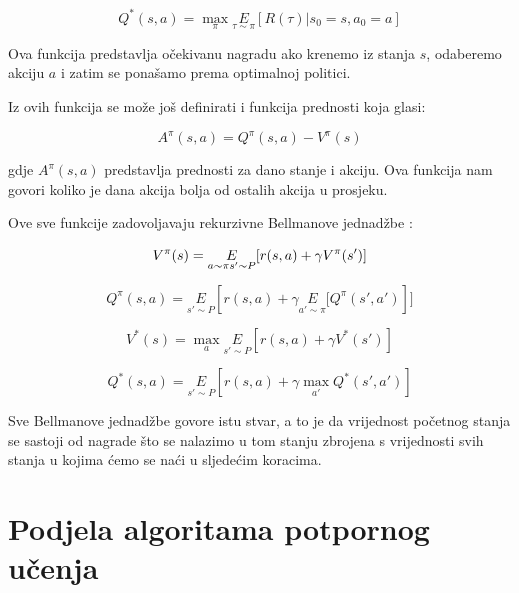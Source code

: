 \documentclass[times,utf8,diplomski]{fer}
\begin{document}
\begin{equation}
	\label{četvrta vrijednosna}
	Q^*(s,a) = \max_{\pi} \underset{\tau \sim \pi}E[{R(\tau)\left| s_0 = s, a_0 = a\right.}]
\end{equation}

\noindent Ova funkcija predstavlja očekivanu nagradu ako krenemo iz stanja ${s}$, odaberemo akciju ${a}$ i zatim se ponašamo prema optimalnoj politici.

Iz ovih funkcija se može još definirati i funkcija prednosti koja glasi:

\begin{equation}
	\label{funkcija prednosti}
	A^{\pi}(s,a) = Q^{\pi}(s,a) - V^{\pi}(s)
\end{equation}

\noindent gdje ${A^{\pi}(s,a)}$ predstavlja prednosti za dano stanje i akciju. Ova funkcija nam govori koliko je dana akcija bolja od ostalih akcija u prosjeku.


Ove sve funkcije zadovoljavaju rekurzivne Bellmanove jednadžbe \citep{Bellman716}:

\begin{equation}
	\label{belman 1}
	V^{\pi}(s) = \underset{a \sim \pi \\ s'\sim P}E[{r(s,a) + \gamma V^{\pi}(s')}]
\end{equation}

\begin{equation}
	\label{belman 2}
	Q^{\pi}(s,a) = \underset{s'\sim P}E[{r(s,a) + \gamma \underset{a'\sim \pi}E[{Q^{\pi}(s',a')}}]]
\end{equation}

\begin{equation}
	\label{belman 3}
	V^*(s) = \max_a \underset{s'\sim P}E[{r(s,a) + \gamma V^*(s')}]
\end{equation}

\begin{equation}
	\label{belman 4}
	Q^*(s,a) = \underset{s'\sim P}E[{r(s,a) + \gamma \max_{a'} Q^*(s',a')}]
\end{equation}

\noindent Sve Bellmanove jednadžbe govore istu stvar, a to je da vrijednost početnog stanja se sastoji od nagrade što se nalazimo u tom stanju zbrojena s vrijednosti svih stanja u kojima ćemo se naći u sljedećim koracima.

\section{Podjela algoritama potpornog učenja}
\end{document}
